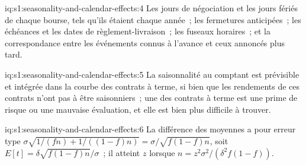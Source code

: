 \begin{solution}{iq:s1:seasonality-and-calendar-effects:4}
Les jours de négociation et les jours fériés de chaque bourse, tels qu'ils étaient chaque année~; les fermetures anticipées~; les échéances et les dates de règlement-livraison~; les fuseaux horaires~; et la correspondance entre les événements
connus à l'avance et ceux annoncés plus tard.
\end{solution}

\begin{solution}{iq:s1:seasonality-and-calendar-effects:5}
La saisonnalité au comptant est prévisible et intégrée dans la courbe des contrats à terme, si bien que les rendements de ces contrats n'ont pas à être saisonniers~; une  des contrats à terme est
une prime de risque ou une mauvaise évaluation, et elle est bien plus difficile à trouver.
\end{solution}

\begin{solution}{iq:s1:seasonality-and-calendar-effects:6}
La différence des moyennes a pour erreur type $\sigma\sqrt{1/(fn) + 1/((1 - f)n)} = \sigma/\sqrt{f(1 - f)n}$, soit $E[t] = \delta\sqrt{f(1 - f)n}/\sigma$~; il
atteint $z$ lorsque $n = z^2\sigma^2/(\delta^2 f(1 - f))$.
\end{solution}
